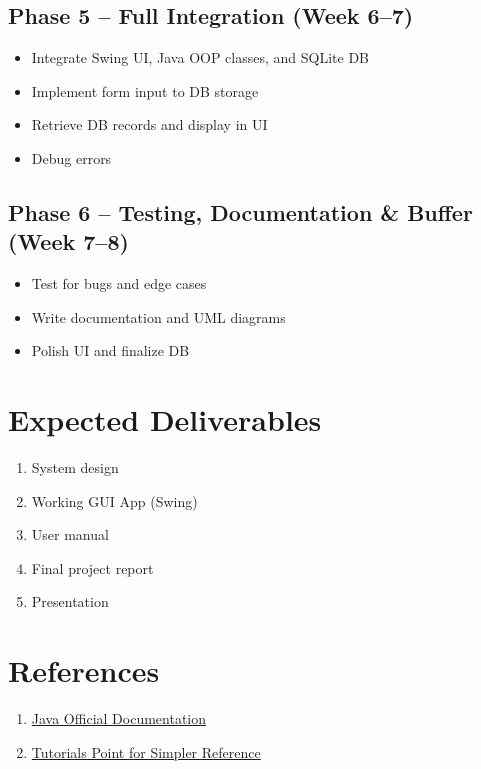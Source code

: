 \documentclass[12pt,a4paper]{article}
\begin{document}
\subsection*{Phase 5 – Full Integration (Week 6–7)}
\begin{itemize}
  \item Integrate Swing UI, Java OOP classes, and SQLite DB
  \item Implement form input to DB storage
  \item Retrieve DB records and display in UI
  \item Debug errors
\end{itemize}

\subsection*{Phase 6 – Testing, Documentation \& Buffer (Week 7–8)}
\begin{itemize}
  \item Test for bugs and edge cases
  \item Write documentation and UML diagrams
  \item Polish UI and finalize DB
\end{itemize}

\section*{Expected Deliverables}
\begin{enumerate}
  \item System design
  \item Working GUI App (Swing)
  \item User manual
  \item Final project report
  \item Presentation
\end{enumerate}

\section*{References}
\begin{enumerate}
  \item \href{https://dev.java}{Java Official Documentation}
  \item \href{https://www.tutorialspoint.com/java/index.htm}{Tutorials Point for Simpler Reference}
\end{enumerate}
\end{document}
